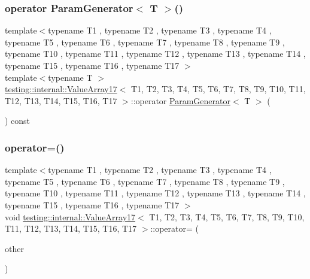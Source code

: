 \subsubsection{\texorpdfstring{operator ParamGenerator$<$ T $>$()}{operator ParamGenerator< T >()}}
{\footnotesize\ttfamily template$<$typename T1 , typename T2 , typename T3 , typename T4 , typename T5 , typename T6 , typename T7 , typename T8 , typename T9 , typename T10 , typename T11 , typename T12 , typename T13 , typename T14 , typename T15 , typename T16 , typename T17 $>$ \\
template$<$typename T $>$ \\
\mbox{\hyperlink{classtesting_1_1internal_1_1_value_array17}{testing\+::internal\+::\+Value\+Array17}}$<$ T1, T2, T3, T4, T5, T6, T7, T8, T9, T10, T11, T12, T13, T14, T15, T16, T17 $>$\+::operator \mbox{\hyperlink{classtesting_1_1internal_1_1_param_generator}{Param\+Generator}}$<$ T $>$ (\begin{DoxyParamCaption}{ }\end{DoxyParamCaption}) const\hspace{0.3cm}{\ttfamily [inline]}}

\mbox{\label{classtesting_1_1internal_1_1_value_array17_afb64e40218b53e8cd2e5cc320041e16d}} 
\subsubsection{\texorpdfstring{operator=()}{operator=()}}
{\footnotesize\ttfamily template$<$typename T1 , typename T2 , typename T3 , typename T4 , typename T5 , typename T6 , typename T7 , typename T8 , typename T9 , typename T10 , typename T11 , typename T12 , typename T13 , typename T14 , typename T15 , typename T16 , typename T17 $>$ \\
void \mbox{\hyperlink{classtesting_1_1internal_1_1_value_array17}{testing\+::internal\+::\+Value\+Array17}}$<$ T1, T2, T3, T4, T5, T6, T7, T8, T9, T10, T11, T12, T13, T14, T15, T16, T17 $>$\+::operator= (\begin{DoxyParamCaption}\item[{const \mbox{\hyperlink{classtesting_1_1internal_1_1_value_array17}{Value\+Array17}}$<$ T1, T2, T3, T4, T5, T6, T7, T8, T9, T10, T11, T12, T13, T14, T15, T16, T17 $>$ \&}]{other }\end{DoxyParamCaption})\hspace{0.3cm}{\ttfamily [private]}}



